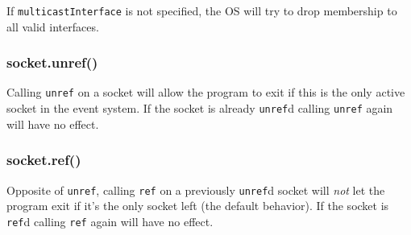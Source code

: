 If \texttt{multicastInterface} is not specified, the OS will try to drop
membership to all valid interfaces.

\subsubsection{socket.unref()}\label{socket.unref}

Calling \texttt{unref} on a socket will allow the program to exit if
this is the only active socket in the event system. If the socket is
already \texttt{unref}d calling \texttt{unref} again will have no
effect.

\subsubsection{socket.ref()}\label{socket.ref}

Opposite of \texttt{unref}, calling \texttt{ref} on a previously
\texttt{unref}d socket will \emph{not} let the program exit if it's the
only socket left (the default behavior). If the socket is \texttt{ref}d
calling \texttt{ref} again will have no effect.
